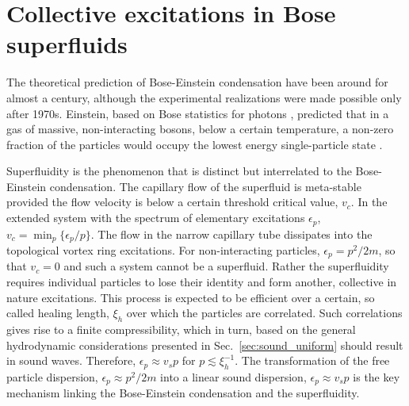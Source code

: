\section{Collective excitations in Bose superfluids}
The theoretical prediction of Bose-Einstein condensation have been around for almost a century, although the experimental realizations were made possible only after 1970s. Einstein, based on Bose statistics for photons \cite{Bose1924}, predicted that in a gas of massive, non-interacting bosons, below a certain temperature, a non-zero fraction of the particles would occupy the lowest energy single-particle state \cite{Einstein1924}. 

Superfluidity is the phenomenon that is distinct but interrelated to the Bose-Einstein condensation.
The capillary flow of the superfluid is %
meta-stable provided the flow velocity is below a certain threshold critical value, $v_c$.
In the extended system with the spectrum of elementary excitations $\epsilon_{p}$, $v_{c} = \min_p \{\epsilon_{p}/p\}$.
The flow in the narrow capillary tube dissipates into the topological vortex ring excitations.
For non-interacting particles, $\epsilon_p = p^2/2 m$, so that $v_c=0$ and such a system cannot be a superfluid.
Rather the superfluidity requires individual particles to lose their identity and form another, collective in nature excitations.
This process is expected to be efficient over a certain, so called healing length,  $\xi_h$ over which the particles are correlated.
Such correlations gives rise to a finite compressibility, which in turn, based on the general hydrodynamic considerations presented in 
Sec.~\ref{sec:sound_uniform} should result in sound waves.
Therefore, $\epsilon_p \approx v_s p$ for $p \lesssim \xi_h^{-1}$.
The transformation of the free particle dispersion, $\epsilon_p \approx p^2/ 2 m$ into a linear sound dispersion, $\epsilon_p \approx v_s p$ is the key mechanism linking the Bose-Einstein condensation and the superfluidity.





